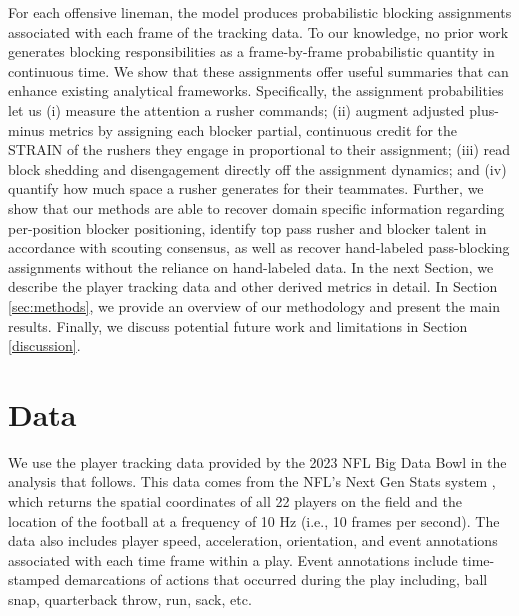 \documentclass[USenglish]{article}
\theoremstyle{dgthm}
\theoremstyle{dgdef}
\begin{document}
 For each offensive lineman, the model produces probabilistic blocking assignments associated with each frame of the tracking data. To our knowledge, no prior work generates blocking responsibilities as a frame-by-frame probabilistic quantity in continuous time. We show that these assignments offer useful summaries that can enhance existing analytical frameworks. Specifically, the assignment probabilities let us (i) measure the attention a rusher commands; (ii) augment adjusted plus-minus metrics \citep{Macdonald+2012} by assigning each blocker partial, continuous credit for the STRAIN \citep{nguyen2023here} of the rushers they engage in proportional to their assignment; (iii) read block shedding and disengagement directly off the assignment dynamics; and (iv) quantify how much space a rusher generates for their teammates. Further, we show that our methods are able to recover domain specific information regarding per-position blocker positioning, identify top pass rusher and blocker talent in accordance with scouting consensus, as well as recover hand-labeled pass-blocking assignments without the reliance on hand-labeled data. In the next Section, we describe the player tracking data and other derived metrics in detail.
In Section \ref{sec:methods}, we provide an overview of our methodology and present the main results.  Finally, we discuss potential future work and limitations in Section \ref{discussion}.


\section{Data} \label{data}
We use the player tracking data provided by the 2023 NFL Big Data Bowl \citep{howard2023nfl} in the analysis that follows.  This data comes from the NFL's Next Gen Stats system \citep{nfl2023ngs}, which returns the spatial coordinates of all 22 players on the field and the location of the football at a frequency of 10 Hz (i.e., 10 frames per second).  The data also includes player speed, acceleration, orientation, and event annotations associated with each time frame within a play.  Event annotations include time-stamped demarcations of actions that occurred during the play including, ball snap, quarterback throw, run, sack, etc. 
\end{document}

